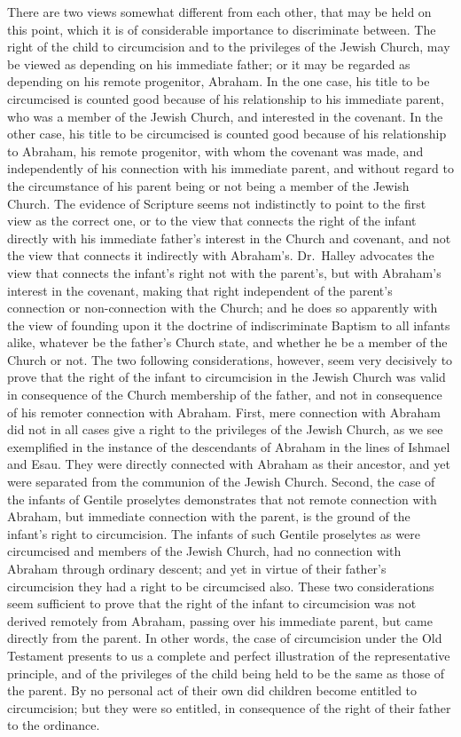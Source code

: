 \documentclass[]{book}
\begin{document}
There are two views somewhat different from each other, that may be held on this point, which it is of considerable importance to discriminate between. The right of the child to circumcision and to the privileges of the Jewish Church, may be viewed as depending on his immediate father; or it may be regarded as depending on his remote progenitor, Abraham. In the one case, his title to be circumcised is counted good because of his relationship to his immediate parent, who was a member of the Jewish Church, and interested in the covenant. In the other case, his title to be circumcised is counted good because of his relationship to Abraham, his remote progenitor, with whom the covenant was made, and independently of his connection with his immediate parent, and without regard to the circumstance of his parent being or not being a member of the Jewish Church. The evidence of Scripture seems not indistinctly to point to the first view as the correct one, or to the view that connects the right of the infant directly with his immediate father's interest in the Church and covenant, and not the view that connects it indirectly with Abraham's. Dr.~Halley advocates the view that connects the infant's right not with the parent's, but with Abraham's interest in the covenant, making that right independent of the parent's connection or non-connection with the Church; and he does so apparently with the view of founding upon it the doctrine of indiscriminate Baptism to all infants alike, whatever be the father's Church state, and whether he be a member of the Church or not. The two following considerations, however, seem very decisively to prove that the right of the infant to circumcision in the Jewish Church was valid in consequence of the Church membership of the father, and not in consequence of his remoter connection with Abraham. First, mere connection with Abraham did not in all cases give a right to the privileges of the Jewish Church, as we see exemplified in the instance of the descendants of Abraham in the lines of Ishmael and Esau. They were directly connected with Abraham as their ancestor, and yet were separated from the communion of the Jewish Church. Second, the case of the infants of Gentile proselytes demonstrates that not remote connection with Abraham, but immediate connection with the parent, is the ground of the infant's right to circumcision. The infants of such Gentile proselytes as were circumcised and members of the Jewish Church, had no connection with Abraham through ordinary descent; and yet in virtue of their father's circumcision they had a right to be circumcised also. These two considerations seem sufficient to prove that the right of the infant to circumcision was not derived remotely from Abraham, passing over his immediate parent, but came directly from the parent. In other words, the case of circumcision under the Old Testament presents to us a complete and perfect illustration of the representative principle, and of the privileges of the child being held to be the same as those of the parent. By no personal act of their own did children become entitled to circumcision; but they were so entitled, in consequence of the right of their father to the ordinance.
\end{document}
